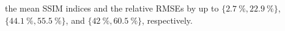 %
%
%
the mean \acl{SSIM} indices and
%
%
%
%
%
the relative \aclp{RMSE} by
up to
$\{ \SI{2.7}{\percent}, \SI{22.9}{\percent} \}$,
$\{ \SI{44.1}{\percent}, \SI{55.5}{\percent} \}$, and
$\{ \SI{42}{\percent}, \SI{60.5}{\percent} \}$,
respectively.

